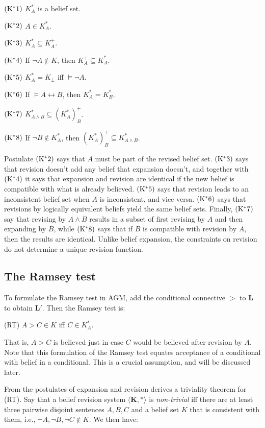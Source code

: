 \documentclass[12pt]{article}
\begin{document}
$\pst{*1}$ $K_A^*$ is a belief set.

$\pst{*2}$ $A\in K_A^*$.

$\pst{*3}$ $K_A^* \subseteq K_A^+$.

$\pst{*4}$ If $\neg A\not\in K$, then $K_A^+ \subseteq K_A^*$.

$\pst{*5}$ $K_A^* = K_\bot$ iff $\vDash \neg A$.

$\pst{*6}$ If $\vDash A\leftrightarrow B$, then $K_A^* = K_B^*$.

$\pst{*7}$ $K_{A\land B}^* \subseteq (K_A^*)_B^+$.

$\pst{*8}$ If $\neg B\not\in K_A^*$, then $(K_A^*)_B^+ \subseteq K_{A\land B}^*$.

Postulate $\pst{*2}$ says that $A$ must be part of the revised belief set. $\pst{*3}$ says that revision doesn't add any belief that expansion doesn't, and together with $\pst{*4}$ it says that expansion and revision are identical if the new belief is  compatible with what is already believed. $\pst{*5}$ says that revision leads to an inconsistent belief set when $A$ is inconsistent, and vice versa. $\pst{*6}$ says that revisions by logically equivalent beliefs yield the same belief sets. Finally, $\pst{*7}$ say that revising by $A\land B$ results in a subset of first revising by $A$ and then expanding by $B$, while $\pst{*8}$ says that if $B$ is compatible with revision by $A$, then the results are identical. Unlike belief expansion, the constraints on revision do not determine a unique revision function.

\subsection{The Ramsey test}

To formulate the Ramsey test in AGM, add the conditional connective $>$ to \textbf{L} to obtain $\mathbf{L'}$. Then the Ramsey test is:

(RT) $A>C \in K$ iff $C \in K_A^*$.

That is, $A>C$ is believed just in case $C$ would be believed after revision by $A$. Note that this formulation of the Ramsey test equates acceptance of a conditional with belief in a conditional. This is a crucial assumption, and will be discussed later.

From the postulates of expansion and revision \gf{} derives a triviality theorem for (RT). Say that a belief revision system $\langle \mathbf{K}, * \rangle$ is \textit{non-trivial} iff there are at least three pairwise disjoint sentences $A,B,C$ and a belief set $K$ that is consistent with them, i.e., $\neg A, \neg B, \neg C \not\in K$. We then have:
\end{document}
